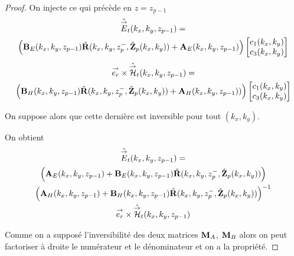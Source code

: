 \begin{proof}
      On injecte ce qui précède en \(z = z_{p-1}\)
      \begin{multline*}
        \hat{{\overset{\rightarrow}{E}}}_t(k_x,k_y,z_{p-1}) = 
        \\
        \left(\mathbf{B}_{E}(k_x,k_y,z_{p-1})\hat{\mathbf{R}}(k_x,k_y,z_p^-,\hat{\mathbf{Z}}_p(k_x,k_y)) + \mathbf{A}_{E}(k_x,k_y,z_{p-1})\right)
        \begin{bmatrix}
          c_1(k_x,k_y) \\
          c_3(k_x,k_y)
        \end{bmatrix}
      \end{multline*}        
      \begin{multline*}
        {\overset{\rightarrow}{e_r}}\times\hat{{\overset{\rightarrow}{\mathcal{H}}}}_t(k_x,k_y,z_{p-1}) =
        \\
        \left(\mathbf{B}_{H}(k_x,k_y,z_{p-1})\hat{\mathbf{R}}(k_x,k_y,z_p^-,\hat{\mathbf{Z}}_p(k_x,k_y)) + \mathbf{A}_{H}(k_x,k_y,z_{p-1}))\right)
        \begin{bmatrix}
          c_1(k_x,k_y) \\
          c_3(k_x,k_y)
        \end{bmatrix}
      \end{multline*}

      On suppose alors que cette dernière est inversible pour tout \((k_x,k_y)\).

      On obtient
      \begin{multline*}
        \hat{{\overset{\rightarrow}{E}}}_t(k_x,k_y,z_{p-1}) =
        \\
        \left(\mathbf{A}_{E}(k_x,k_y,z_{p-1}) + \mathbf{B}_{E}(k_x,k_y,z_{p-1})\hat{\mathbf{R}}(k_x,k_y,z_p^-,\hat{\mathbf{Z}}_p(k_x,k_y))\right) \\
        \left(\mathbf{A}_{H}(k_x,k_y,z_{p-1}) + \mathbf{B}_{H}(k_x,k_y,z_{p-1})\hat{\mathbf{R}}(k_x,k_y,z_p^-,\hat{\mathbf{Z}}_p(k_x,k_y))\right)^{-1}
        \\
        {\overset{\rightarrow}{e_r}}\times\hat{{\overset{\rightarrow}{\mathcal{H}}}}_t(k_x,k_y,z_{p-1})
      \end{multline*}

      Comme on a supposé l'inversibilité des deux matrices \(\mathbf{M}_{A}\), \(\mathbf{M}_{B}\) alors on peut factoriser à droite le numérateur et le dénominateur et on a la propriété.
    \end{proof}

